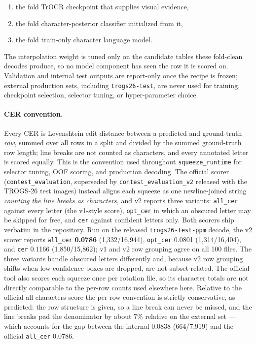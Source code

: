 \documentclass[11pt]{article}
\newcommand{\cer}{\mbox{CER}}
\begin{document}
\begin{enumerate}
  \item the fold TrOCR checkpoint that supplies visual evidence,
  \item the fold character-posterior classifier initialized from it,
  \item the fold train-only character language model.
\end{enumerate}

The interpolation weight is tuned only on the candidate tables these fold-clean decodes produce, so no model
component has seen the row it is scored on. Validation and internal test outputs are report-only
once the recipe is frozen; external production sets, including \texttt{trogs26-test}, are never
used for training, checkpoint selection, selector tuning, or hyper-parameter choice.

\paragraph{CER convention.} Every \cer{} is Levenshtein edit distance between a predicted and
ground-truth \emph{row}, summed over all rows in a split and divided by the summed ground-truth
row length; line breaks are not counted as characters, and every annotated letter is scored
equally. This is the convention used throughout \texttt{squeeze\_runtime} for selector tuning,
OOF scoring, and production decoding. The official scorer (\texttt{contest\_evaluation},
superseded by \texttt{contest\_evaluation\_v2} released with the TROGS-26 test images) instead
aligns each squeeze as one newline-joined string \emph{counting the line breaks as characters},
and v2 reports three variants: \texttt{all\_cer} against every letter (the v1-style score),
\texttt{opt\_cer} in which an obscured letter may be skipped for free, and \texttt{cer} against
confident letters only. Both scorers ship verbatim in the repository. Run on the released
\texttt{trogs26-test-ppm} decode, the v2 scorer reports \texttt{all\_cer} \textbf{0.0786}
(1{,}332/16{,}944), \texttt{opt\_cer} 0.0801 (1{,}314/16{,}404), and \texttt{cer} 0.1166
(1{,}850/15{,}862); v1 and v2 row grouping agree on all 100 files. The three variants handle
obscured letters differently and, because v2 row grouping shifts when low-confidence boxes are
dropped, are not subset-related. The official tool also scores each squeeze once per rotation
file, so its character totals are not directly comparable to the per-row counts used elsewhere
here. Relative to the official all-characters score the per-row convention is strictly
conservative, as predicted: the row structure is given, so a line break can never be missed, and
the line breaks pad the denominator by about 7\% relative on the external set --- which accounts
for the gap between the internal 0.0838 (664/7{,}919) and the official \texttt{all\_cer} 0.0786.
\end{document}
